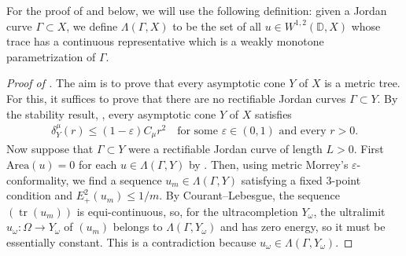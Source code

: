 \documentclass[a4paper,leqno]{amsart}
\numberwithin{equation}{section}
\theoremstyle{remark}
\theoremstyle{remark}
\DeclareMathOperator{\trace}{tr}
\begin{document}
For the proof of  and below, we will use the following definition: given a Jordan curve $\Gamma \subset X$, we define $\Lambda( \Gamma, X )$ to be the set of all $u \in W^{1,2}( \mathbb{D}, X )$ whose trace has a continuous representative which is a weakly monotone parametrization of $\Gamma$. 
\begin{proof}[Proof of ]
The aim is to prove that every asymptotic cone $Y$ of $X$ is a metric tree. For this, it suffices to prove that there are no rectifiable Jordan curves $\Gamma \subset Y$. By the stability result, , every asymptotic cone $Y$ of $X$ satisfies
\begin{align*}
    \delta_{ Y }^{\mu}(r) \leq (1-\varepsilon) C_\mu r^2 \quad\text{for some $\varepsilon \in (0,1)$ and every $r > 0$.}
\end{align*}
Now suppose that $\Gamma \subset Y$ were a rectifiable Jordan curve of length $L > 0$. First $\mathrm{Area}(u) = 0$ for each $u \in \Lambda( \Gamma, Y )$ by . Then, using metric Morrey's $\varepsilon$-conformality, we find a sequence $u_m \in \Lambda( \Gamma, Y )$ satisfying a fixed 3-point condition and $E^{2}_{+}(u_m) \leq 1/m$. By Courant--Lebesgue, the sequence $( \trace( u_m ) )$ is equi-continuous, so, for the ultracompletion $Y_\omega$, the ultralimit $u_\omega \colon \Omega \to Y_\omega$ of $( u_m )$ belongs to $\Lambda( \Gamma, Y_\omega )$ and has zero energy, so it must be essentially constant. This is a contradiction because $u_\omega \in \Lambda( \Gamma, Y_\omega )$.
\end{proof}
\end{document}
